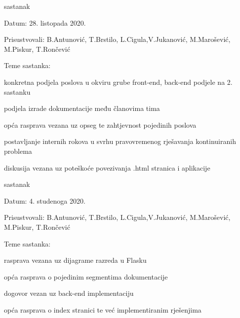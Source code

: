 \begin{packed_enum}
			\item  sastanak
			\item[] \begin{packed_item}
				\item Datum: 28. listopada 2020.
				\item Prisustvovali: B.Antunović, T.Brstilo, L.Cigula,V.Jukanović, M.Marošević, M.Piskur, T.Rončević
				\item Teme sastanka:
				\begin{packed_item}
					\item  konkretna podjela poslova u okviru grube front-end, back-end podjele na 2. sastanku
					\item  podjela izrade dokumentacije među članovima tima
					\item  opća rasprava vezana uz opseg te zahtjevnost pojedinih poslova
					\item  postavljanje internih rokova u svrhu pravovremenog rješavanja kontinuiranih problema
					\item  diskusija vezana uz poteškoće povezivanja .html stranica i aplikacije
				\end{packed_item}
			\end{packed_item}			
			
			\item  sastanak
			\item[] \begin{packed_item}
				\item Datum: 4. studenoga 2020.
				\item Prisustvovali: B.Antunović, T.Brstilo, L.Cigula,V.Jukanović, M.Marošević, M.Piskur, T.Rončević
				\item Teme sastanka:
				\begin{packed_item}
					\item  rasprava vezana uz dijagrame razreda u Flasku
					\item  opća rasprava o pojedinim segmentima dokumentacije
					\item  dogovor vezan uz back-end implementaciju
					\item  opća rasprava o index stranici te već implementiranim rješenjima
				\end{packed_item}
			\end{packed_item}	
			

\end{packed_enum}
